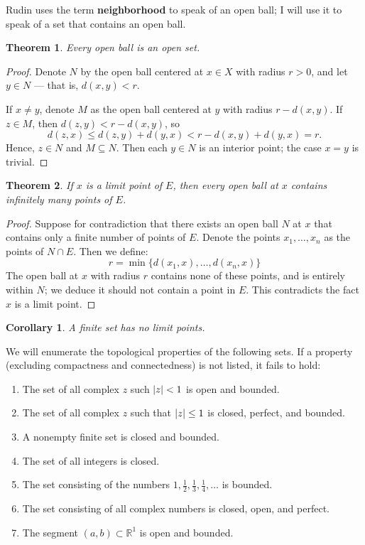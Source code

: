 \documentclass[11pt]{article}
\newtheorem{theorem}{Theorem}
\newtheorem{corollary}{Corollary}
\begin{document}
Rudin uses the term \textbf{neighborhood} to speak of an open ball; I will use it to speak of a set that contains an open ball.

\newpage

\begin{theorem}
	Every open ball is an open set.
\end{theorem}
\begin{adjustwidth}{1cm}{}
	\begin{proof}
		Denote $N$ by the open ball centered at $x \in X$ with radius $r > 0$, and let $y \in N$ --- that is, $d(x, y) < r$.

		If $x \ne y$, denote $M$ as the open ball centered at $y$ with radius $r - d(x, y)$. If $z \in M$, then $d(z, y) < r - d(x, y)$, so
		\[
			d(z, x) \le d(z, y) + d(y, x) < r - d(x, y) + d(y, x) = r.
		\]
		Hence, $z \in N$ and $M \subseteq N$. Then each $y \in N$ is an interior point; the case $x = y$ is trivial.
	\end{proof}
\end{adjustwidth}

\begin{theorem}
	If $x$ is a limit point of $E$, then every open ball at $x$ contains infinitely many points of $E$.
\end{theorem}
\begin{adjustwidth}{1cm}{}
	\begin{proof}
		Suppose for contradiction that there exists an open ball $N$ at $x$ that contains only a finite number of points of $E$. Denote the points $x_{1}, \ldots, x_{n}$ as the points of $N \cap E$. Then we define:
		\[
			r = \min \{ d(x_{1}, x), \ldots, d(x_{n}, x) \}
		\]
		The open ball at $x$ with radius $r$ contains none of these points, and is entirely within $N$; we deduce it should not contain a point in $E$. This contradicts the fact $x$ is a limit point.
	\end{proof}
\end{adjustwidth}
\begin{corollary}
	A finite set has no limit points.
\end{corollary}

We will enumerate the topological properties of the following sets. If a property (excluding compactness and connectedness) is not listed, it fails to hold:
\begin{enumerate}
	\item The set of all complex $z$ such $\abs{z} < 1$ is open and bounded.
	\item The set of all complex $z$ such that $\abs{z} \le 1$ is closed, perfect, and bounded.
	\item A nonempty finite set is closed and bounded.
	\item The set of all integers is closed.
	\item The set consisting of the numbers $1, \tfrac{1}{2}, \tfrac{1}{3}, \tfrac{1}{4}, \ldots$ is bounded.
	\item The set consisting of all complex numbers is closed, open, and perfect.
	\item The segment $(a, b) \subset \mathbb{R}^{1}$ is open and bounded.
\end{enumerate}
\end{document}
